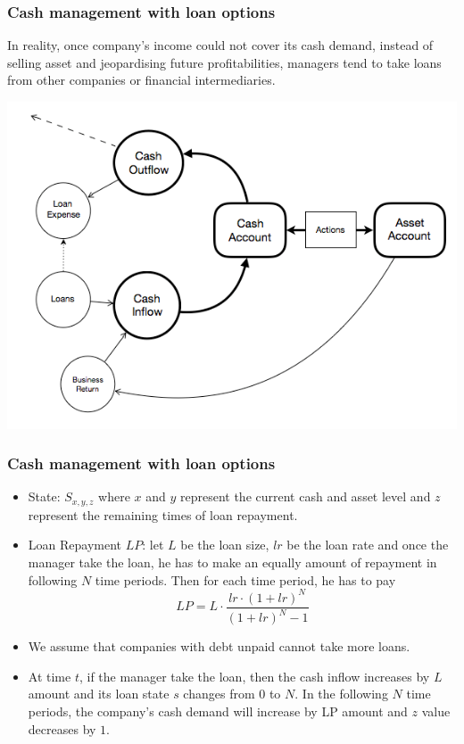 \documentclass{beamer}
\begin{document}
\begin{frame}
\frametitle{Cash management with loan options}
In reality, once company's income could not cover its cash demand, instead of selling asset and jeopardising future profitabilities, managers tend to take loans from other companies or financial intermediaries.



\includegraphics[scale = 0.4]{loan.png}


\end{frame}

\begin{frame}
\frametitle{Cash management with loan options}
\begin{itemize}
\item State: $S_{x,y,z}$ where $x$ and $y$ represent the current cash and asset level and $z$ represent the remaining times of loan repayment.
\item Loan Repayment $LP$: let $L$ be the loan size, $lr$ be the loan rate and once the manager take the loan, he has to make an equally amount of repayment in following $N$ time periods. Then for each time period, he has to pay $$LP = L \cdot \frac{lr \cdot (1+lr)^N}{(1+lr)^N-1}$$
\item We assume that companies with debt unpaid cannot take more loans.
\item At time $t$, if the manager take the loan, then the cash inflow increases by $L$ amount and its loan state $s$ changes from $0$ to $N$. In the following $N$ time periods, the company's cash demand will increase by LP amount and $z$ value decreases by $1$. 
\end{itemize}
\end{frame}
\end{document}
